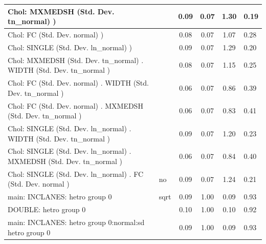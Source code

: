 \begin{table}
\begin{center}
\begin{tabular}{|l|l|c|c|c|l|}
			\hline
			 Chol: MXMEDSH (Std. Dev. tn_normal) ) &  & 0.09 & 0.07 & 1.30 & 0.19 \\
			\hline
			 Chol: FC (Std. Dev. normal) ) &  & 0.08 & 0.07 & 1.07 & 0.28 \\
			\hline
			 Chol: SINGLE (Std. Dev. ln_normal) ) &  & 0.09 & 0.07 & 1.29 & 0.20 \\
			\hline
			 Chol: MXMEDSH (Std. Dev. tn_normal) . WIDTH (Std. Dev.   tn_normal ) &  & 0.08 & 0.07 & 1.15 & 0.25 \\
			\hline
			 Chol: FC (Std. Dev. normal) . WIDTH (Std. Dev.   tn_normal ) &  & 0.06 & 0.07 & 0.86 & 0.39 \\
			\hline
			 Chol: FC (Std. Dev. normal) . MXMEDSH (Std. Dev.   tn_normal ) &  & 0.06 & 0.07 & 0.83 & 0.41 \\
			\hline
			 Chol: SINGLE (Std. Dev. ln_normal) . WIDTH (Std. Dev.   tn_normal ) &  & 0.09 & 0.07 & 1.20 & 0.23 \\
			\hline
			 Chol: SINGLE (Std. Dev. ln_normal) . MXMEDSH (Std. Dev.   tn_normal ) &  & 0.06 & 0.07 & 0.84 & 0.40 \\
			\hline
			 Chol: SINGLE (Std. Dev. ln_normal) . FC (Std. Dev.   normal ) & no & 0.09 & 0.07 & 1.24 & 0.21 \\
			\hline
			main: INCLANES: hetro group 0 & sqrt & 0.09 & 1.00 & 0.09 & 0.93 \\
			\hline
			DOUBLE: hetro group 0 &  & 0.10 & 1.00 & 0.10 & 0.92 \\
			\hline
			main: INCLANES: hetro group 0:normal:sd  hetro group 0 &  & 0.09 & 1.00 & 0.09 & 0.93 \\
			\hline
		\end{tabular}
	\end{center}
\end{table}